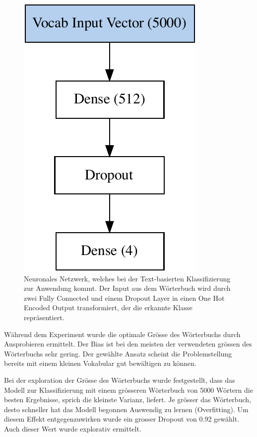\begin{figure}[h!]
    \captionsetup{width=.9\linewidth}
    \caption[Neuronales Netzwerk, welches bei der Text-basierten Klassifizierung zur Anwendung kommt]{Neuronales Netzwerk, welches bei der Text-basierten Klassifizierung zur Anwendung kommt. Der Input aus dem Wörterbuch wird durch zwei Fully Connected und einem Dropout Layer in einen One Hot Encoded Output transformiert, der die erkannte Klasse repräsentiert.}
    \label{text-classification-model}
    \centering
    \includegraphics[scale=0.6]{graphics/text-classification/model.pdf}
\end{figure} 

Während dem Experiment wurde die optimale Grösse des Wörterbuchs durch Ausprobieren ermittelt. Der Bias ist bei den meisten der verwendeten grössen des Wörterbuchs sehr gering. Der gewählte Ansatz scheint die Problemstellung bereits mit einem kleinen Vokabular gut bewältigen zu können.

Bei der exploration der Grösse des Wörterbuchs wurde festgestellt, dass das Modell zur Klassifizierung mit einem grösseren Wörterbuch von 5000 Wörtern die besten Ergebnisse, sprich die kleinste Varianz, liefert. Je grösser das Wörterbuch, desto schneller hat das Modell begonnen Auswendig zu lernen (Overfitting). Um diesem Effekt entgegenzuwirken wurde ein grosser Dropout von 0.92 gewählt. Auch dieser Wert wurde explorativ ermittelt.

